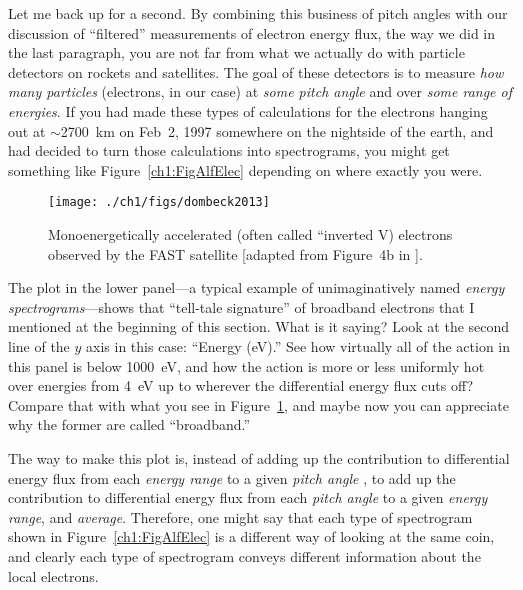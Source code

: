 Let me back up for a second. By combining this business of pitch
angles with our discussion of ``filtered'' measurements of electron
energy flux, the way we did in the last paragraph, you are not far
from what we actually do with particle detectors on rockets and
satellites. The goal of these detectors is to measure \emph{how many
  particles} (electrons, in our case) at \emph{some pitch angle} and
over \emph{some range of energies}. If you had made these types of
calculations for the electrons hanging out at $\sim$2700~km on Feb~2,
1997 somewhere on the nightside of the earth, and had decided to turn
those calculations into spectrograms, you might get something like
Figure~\ref{ch1:FigAlfElec} depending on where exactly you were.


\begin{figure}
  \centering
  \noindent\texttt{[image: ./ch1/figs/dombeck2013]}
  \caption[Inverted V (monoenergetic) electrons]{Monoenergetically
    accelerated (often called ``inverted V) electrons observed by
    the FAST satellite [adapted from Figure~4b in \citealp{Dombeck2013}].}
  \label{ch1:FigDombeck}
\end{figure}


The plot in the lower panel---a typical example of unimaginatively
named \emph{energy spectrograms}---shows that ``tell-tale signature''
of broadband electrons that I mentioned at the beginning of this
section. What is it saying? Look at the second line of the $y$ axis in
this case: ``Energy (eV).'' See how virtually all of the action in
this panel is below 1000~eV, and how the action is more or less
uniformly hot over energies from 4~eV up to wherever the differential
energy flux cuts off? Compare that with what you see in
Figure~\ref{ch1:FigDombeck}, and maybe now you can appreciate why the
former are called ``broadband.'' 

The way to make this plot is, instead of adding up the contribution to
differential energy flux from each \emph{energy range} to a given
\emph{pitch angle} , to add up the contribution to differential energy
flux from each \emph{pitch angle} to a given \emph{energy range}, and
\emph{average}. Therefore, one might say that each type of spectrogram
shown in Figure~\ref{ch1:FigAlfElec} is a different way of looking at
the same coin, and clearly each type of spectrogram conveys different
information about the local electrons.

